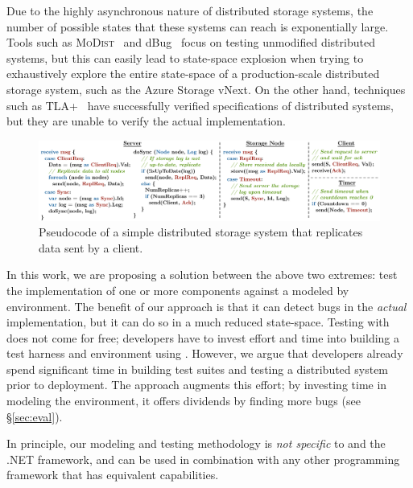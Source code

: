 Due to the highly asynchronous nature of distributed storage systems, the number of possible states that these systems can reach is exponentially large. Tools such as \textsc{MoDist}~\cite{yang2009modist} and dBug~\cite{simsa2011dbug} focus on testing unmodified distributed systems, but this can easily lead to state-space explosion when trying to exhaustively explore the entire state-space of a production-scale distributed storage system, such as the Azure Storage vNext. On the other hand, techniques such as TLA+~\cite{lamport1994temporal} have successfully verified specifications of distributed systems, but they are unable to verify the actual implementation.

\begin{figure}[t]
\centering
\includegraphics[width=\linewidth]{img/example_code}
\vspace{-7mm}
\caption{Pseudocode of a simple distributed storage system that replicates data sent by a client.}
\label{fig:example}
\vspace{-2mm}
\end{figure}

In this work, we are proposing a solution between the above two extremes: test the implementation of one or more components against a modeled by \psharp environment. The benefit of our approach is that it can detect bugs in the \emph{actual} implementation, but it can do so in a much reduced state-space. Testing with \psharp does not come for free; developers have to invest effort and time into building a test harness and environment using \psharp. However, we argue that developers already spend significant time in building test suites and testing a distributed system prior to deployment. The \psharp approach augments this effort; by investing time in modeling the environment, it offers dividends by finding more bugs (see \S\ref{sec:eval}).

In principle, our modeling and testing methodology is \emph{not specific} to \psharp and the .NET framework, and can be used in combination with any other programming framework that has equivalent capabilities.

\vspace{-2mm}
